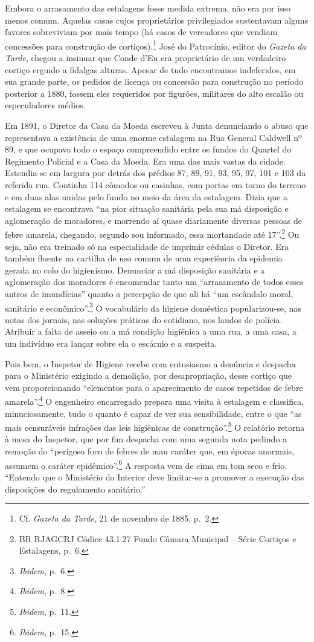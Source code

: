 Embora o arrasamento das estalagens fosse medida extrema, não era por
isso menos comum. Aquelas casas cujos proprietários privilegiados
sustentavam alguns favores sobreviviam por mais tempo (há casos de
vereadores que vendiam concessões para construção de
cortiços).\footnote{Cf. \emph{Gazeta da Tarde}, 21 de novembro de 1885,
  p.~2.} José do Patrocínio, editor do \emph{Gazeta da Tarde}, chegou a
insinuar que Conde d'Eu era proprietário de um verdadeiro cortiço
erguido a fidalgas alturas. Apesar de tudo encontramos indeferidos, em
sua grande parte, os pedidos de licença ou concessão para construção no
período posterior a 1880, fossem eles requeridos por figurões, militares
do alto escalão ou especuladores médios.

Em 1891, o Diretor da Casa da Moeda escreveu à Junta denunciando o abuso
que representava a existência de uma enorme estalagem na Rua General
Caldwell nº 89, e que ocupava todo o espaço compreendido entre os fundos
do Quartel do Regimento Policial e a Casa da Moeda. Era uma das mais
vastas da cidade. Estendia-se em largura por detrás dos prédios 87, 89,
91, 93, 95, 97, 101 e 103 da referida rua. Continha 114 cômodos ou
casinhas, com portas em torno do terreno e em duas alas unidas pelo
fundo no meio da área da estalagem. Dizia que a estalagem se encontrava
``na pior situação sanitária pela sua má disposição e aglomeração de
moradores, e morrendo aí quase diariamente diversas pessoas de febre
amarela, chegando, segundo sou informado, essa mortandade até
17''.\footnote{BR RJAGCRJ Códice 43.1.27 Fundo Câmara Municipal -- Série
  Cortiços e Estalagens, p.~6.} Ou seja, não era treinado só na
especialidade de imprimir cédulas o Diretor. Era também fluente na
cartilha de uso comum de uma experiência da epidemia gerada no colo do
higienismo. Denunciar a má disposição sanitária e a aglomeração dos
moradores é encomendar tanto um ``arrasamento de todos esses antros de
imundícias'' quanto a percepção de que ali há ``um escândalo moral,
sanitário e econômico''.\footnote{\emph{Ibidem}, p.~6.} O vocabulário da
higiene doméstica popularizou-se, nas notas dos jornais, nas soluções
práticas do cotidiano, nos laudos de polícia. Atribuir a falta de asseio
ou a má condição higiênica a uma rua, a uma casa, a um indivíduo era
lançar sobre ela o escárnio e a suspeita.

Pois bem, o Inspetor de Higiene recebe com entusiasmo a denúncia e
despacha para o Ministério exigindo a demolição, por desapropriação,
desse cortiço que vem proporcionando ``elementos para o aparecimento de
casos repetidos de febre amarela''.\footnote{\emph{Ibidem}, p.~8.} O
engenheiro encarregado prepara uma visita à estalagem e classifica,
minuciosamente, tudo o quanto é capaz de ver sua sensibilidade, entre o
que ``as mais censuráveis infrações das leis higiênicas de
construção''.\footnote{\emph{Ibidem}, p.~11.} O relatório retorna à mesa
do Inspetor, que por fim despacha com uma segunda nota pedindo a remoção
do ``perigoso foco de febres de mau caráter que, em épocas anormais,
assumem o caráter epidêmico''.\footnote{\emph{Ibidem}, p.~15.} A
resposta vem de cima em tom seco e frio. ``Entendo que o Ministério do
Interior deve limitar-se a promover a execução das disposições do
regulamento sanitário.''

